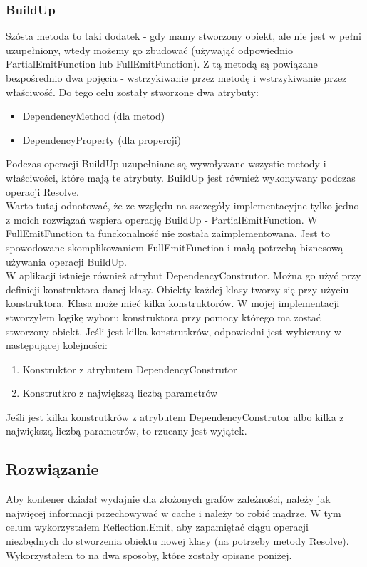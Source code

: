 \documentclass[12pt]{article}
\begin{document}
\subsubsection{BuildUp}
Szósta metoda to taki dodatek - gdy mamy stworzony obiekt, ale nie jest w pełni uzupełniony, wtedy możemy go zbudować (używająć odpowiednio PartialEmitFunction lub FullEmitFunction). Z tą metodą są powiązane bezpośrednio dwa pojęcia - wstrzykiwanie przez metodę i wstrzykiwanie przez właściwość. Do tego celu zostały stworzone dwa atrybuty:
\begin{itemize}
	\item DependencyMethod (dla metod)
	\item DependencyProperty (dla propercji)
\end{itemize}
Podczas operacji BuildUp uzupełniane są wywoływane wszystie metody i właściwości, które mają te atrybuty. BuildUp jest również wykonywany podczas operacji Resolve.\\
Warto tutaj odnotować, że ze względu na szczegóły implementacyjne tylko jedno z moich rozwiązań wspiera operację BuildUp - PartialEmitFunction. W FullEmitFunction ta funckonalność nie została zaimplementowana. Jest to spowodowane skomplikowaniem FullEmitFunction i małą potrzebą biznesową używania operacji BuildUp.\\

W aplikacji istnieje również atrybut DependencyConstrutor. Można go użyć przy definicji konstruktora danej klasy. Obiekty każdej klasy tworzy się przy użyciu konstruktora. Klasa może mieć kilka konstruktorów. W mojej implementacji stworzyłem logikę wyboru konstruktora przy pomocy którego ma zostać stworzony obiekt. Jeśli jest kilka konstrutkrów, odpowiedni jest wybierany w następującej kolejności:
\begin{enumerate}
	\item Konstruktor z atrybutem DependencyConstrutor
	\item Konstrutkro z największą liczbą parametrów
\end{enumerate}
Jeśli jest kilka konstrutkrów z atrybutem DependencyConstrutor albo kilka z największą liczbą parametrów, to rzucany jest wyjątek.


\subsection{Rozwiązanie}
Aby kontener działał wydajnie dla złożonych grafów zależności, należy jak najwięcej informacji przechowywać w cache i należy to robić mądrze. W tym celum wykorzystałem Reflection.Emit, aby zapamiętać ciągu operacji niezbędnych do stworzenia obiektu nowej klasy (na potrzeby metody Resolve). Wykorzystałem to na dwa sposoby, które zostały opisane poniżej.
\end{document}
